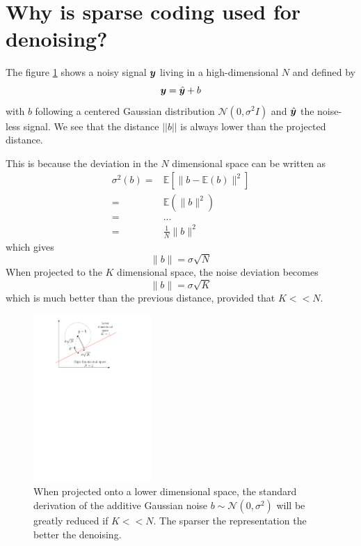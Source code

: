 \section{Why is sparse coding used for denoising?}

The figure \ref{sparse_reduce_noise} shows a noisy signal $\bm y$ living in a high-dimensional $N$ and defined by
$$\bm y=\hat{\bm y} + b$$
with $b$ following a centered Gaussian distribution $\mathcal{N}(0,\sigma^2I)$ and $\hat{\bm y}$ the noise-less signal. We see that the distance $||b||$ is always lower than the projected distance.

This is because the deviation in the $N$ dimensional space can be written as
\begin{align*}
\sigma^2(b) =& \mathbb{E}\left[\lVert b-\mathbb{E}(b) \rVert^2 \right]\\
=& \mathbb{E}\left(\lVert b \rVert^2 \right)\\
=& ... \\ %
=& \frac{1}{N}\lVert b \rVert^2
\end{align*}
which gives 
$$ \lVert b \rVert = \sigma\sqrt{N} $$
When projected to the $K$ dimensional space, the noise deviation becomes
$$\lVert b \rVert = \sigma\sqrt{K} $$
which is much better than the previous distance, provided that $K<<N$. 

\begin{figure}[!ht]\centering
\includegraphics[width=0.4\textwidth]{figures/sparse-reduce-noise.pdf}
\caption{When projected onto a lower dimensional space, the standard derivation of the additive Gaussian noise $b \sim \mathcal{N}(0,\sigma^2)$ will be greatly reduced if $K<<N$. The sparser the representation the better the denoising. \label{sparse_reduce_noise}}
\end{figure}

